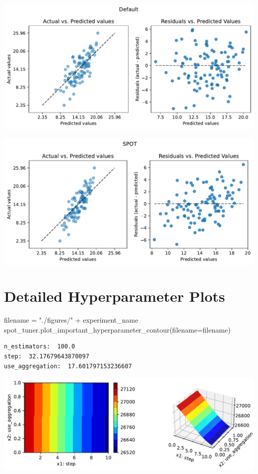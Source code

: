 \documentclass[
  letterpaper,
  DIV=11,
  numbers=noendperiod]{scrreprt}
\newenvironment{Shaded}{\begin{snugshade}}{\end{snugshade}}
\newcommand{\NormalTok}[1]{\textcolor[rgb]{0.00,0.23,0.31}{#1}}
\newcommand{\OperatorTok}[1]{\textcolor[rgb]{0.37,0.37,0.37}{#1}}
\newcommand{\StringTok}[1]{\textcolor[rgb]{0.13,0.47,0.30}{#1}}
\begin{document}
\includegraphics{025_spot_hpt_river_friedman_amfr_files/figure-pdf/cell-35-output-1.pdf}

\includegraphics{025_spot_hpt_river_friedman_amfr_files/figure-pdf/cell-35-output-2.pdf}

\section{Detailed Hyperparameter
Plots}\label{detailed-hyperparameter-plots}

\begin{Shaded}
\begin{Highlighting}[]
\NormalTok{filename }\OperatorTok{=} \StringTok{"./figures/"} \OperatorTok{+}\NormalTok{ experiment\_name}
\NormalTok{spot\_tuner.plot\_important\_hyperparameter\_contour(filename}\OperatorTok{=}\NormalTok{filename)}
\end{Highlighting}
\end{Shaded}

\begin{verbatim}
n_estimators:  100.0
step:  32.17679643870097
use_aggregation:  17.601797153236607
\end{verbatim}

\includegraphics{025_spot_hpt_river_friedman_amfr_files/figure-pdf/cell-36-output-2.pdf}
\end{document}
